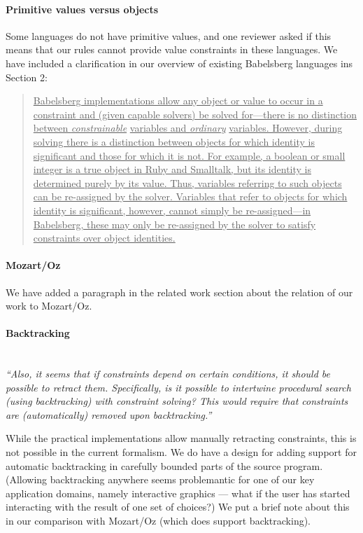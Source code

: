 \documentclass[10pt,twocolumn]{article}
\providecommand{\DIFaddtex}[1]{{\protect\color{BLUE}\uline{#1}}} %
\providecommand{\DIFadd}[1]{\texorpdfstring{\DIFaddtex{#1}}{#1}} %
\begin{document}
\paragraph{Primitive values versus objects}
Some languages do not have primitive values, and one reviewer asked if
this means that our rules cannot provide value constraints in these
languages. We have included a clarification in our overview of
existing Babelsberg languages ins Section 2:
\begin{quote}
\DIFadd{Babelsberg implementations allow any object or value to occur in a
constraint and (given capable solvers) be solved for---there is no
distinction between }\emph{\DIFadd{constrainable}} \DIFadd{variables and }\emph{\DIFadd{ordinary}}
\DIFadd{variables. However, during solving there is a distinction
between objects for
which identity is significant and those for which it is not.
For example, a boolean or small integer is a true object in Ruby and
Smalltalk, but its identity is determined purely by its value.  Thus,
variables referring to such objects can be re-assigned by the
solver. Variables that refer to objects for which identity is
significant, however, cannot simply be re-assigned---in Babelsberg,
these may only be re-assigned by the solver to satisfy constraints
over object identities.}
\end{quote}

\paragraph{Mozart/Oz}
We have added a paragraph in the related work section about the
relation of our work to Mozart/Oz.

\paragraph{Backtracking}~\\
\emph{``Also, it seems that if constraints depend on certain conditions, it
should be possible to retract them. Specifically, is it possible to
intertwine procedural search (using backtracking) with constraint
solving? This would require that constraints are (automatically)
removed upon backtracking.''}

While the practical implementations allow manually retracting constraints,
this is not possible in the current formalism.  We do
have a design for adding support for automatic backtracking in carefully bounded
parts of the source program.  (Allowing backtracking anywhere seems
problemantic for one of our key application domains, namely
interactive graphics --- what if the user has started interacting with
the result of one set of choices?)  We put a brief note about this in
our comparison with Mozart/Oz (which does support backtracking).
\end{document}
